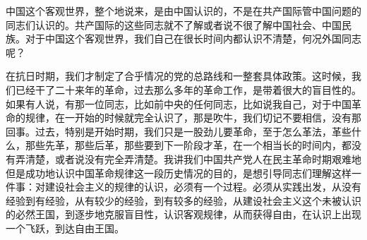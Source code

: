 中国这个客观世界，整个地说来，是由中国认识的，不是在共产国际管中国问题的同志们认识的。共产国际的这些同志就不了解或者说不很了解中国社会、中国民族。对于中国这个客观世界，我们自己在很长时间内都认识不清楚，何况外国同志呢？

在抗日时期，我们才制定了合乎情况的党的总路线和一整套具体政策。这时候，我们已经干了二十来年的革命，过去那么多年的革命工作，是带着很大的盲目性的。如果有人说，有那一位同志，比如前中央的任何同志，比如说我自己，对于中国革命的规律，在一开始的时候就完全认识了，那是吹牛，我们切记不要相信，没有那回事。过去，特别是开始时期，我们只是一股劲儿要革命，至于怎么革法，革些什么，那些先革，那些后革，那些要到下一阶段才革，在一个相当长的时间内，都没有弄清楚，或者说没有完全弄清楚。我讲我们中国共产党人在民主革命时期艰难地但是成功地认识中国革命规律这一段历史情况的目的，是想引导同志们理解这样一件事：对建设社会主义的规律的认识，必须有一个过程。必须从实践出发，从没有经验到有经验，从有较少的经验，到有较多的经验，从建设社会主义这个未被认识的必然王国，到逐步地克服盲目性，认识客观规律，从而获得自由，在认识上出现一个飞跃，到达自由王国。


